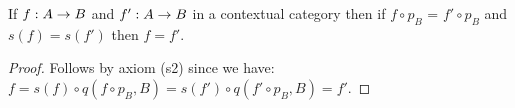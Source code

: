 \newcommand{\duplesone}{{\duple{s_1}_{B_1}}}
\newcommand{\duplestwo}{{\duple{s_1,s_2}_{B_2}}}
\newcommand{\duplesn}{\duple{s_1,...s_n}_{B_n}}
\newcommand{\duplesi}{{\duple{s_1,...s_i}_{B_i}}}
\newcommand{\duplesilessone}{\duple{s_1,...s_{i-1}}_{B_{i-1}}}
\newcommand{\duplesj}{{\duple{s_1,...s_j}_{B_j}}}
\newcommand{\duplesjlessone}{\duple{s_1,...s_{j-1}}_{B_{j-1}}}
\newcommand{\duplesisucc}{{\duple{s_1,...s_{i+1}}_{B_{i+1}}}}
\newcommand{\duplesnlessone}{{\duple{s_1,...s_{n-1}}_{B_{n-1}}}}

\newcommand {\sonesub}{{s_1}^*}
\newcommand {\stwosub}{{s_2}^*}
\newcommand {\stwocascade}{\stwosub\sonesub}
\newcommand {\sisub}{{s_i}^*}
\newcommand {\sicascade}{\sisub...\sonesub}
\newcommand {\sisuccsub}{{s_{i+1}}^*}
\newcommand {\sisucccascade}{\sisuccsub...\sonesub}
\newcommand {\snlessonesub}{{s_{n-1}}^*}
\newcommand {\snlessonecascade}{\snlessonesub...\sonesub}
\newcommand {\snsub}{{s_n}^*}
\newcommand {\sncascade}{\snsub...\sonesub}

\begin{lemma}
\label{footandstactic}
If $f: A \rightarrow B$ and $f':A \rightarrow B$ in a contextual category \catcw then if 
$f \circ p_B$ = $f' \circ p_B$ and $s(f) = s(f')$ then $f=f'$.
\end{lemma}
\begin{proof}
Follows by axiom (s2) since we have:
$f = s(f) \circ q(f \circ p_B,B)  = s(f') \circ q(f' \circ p_B,B) = f'$.
\end{proof} 





